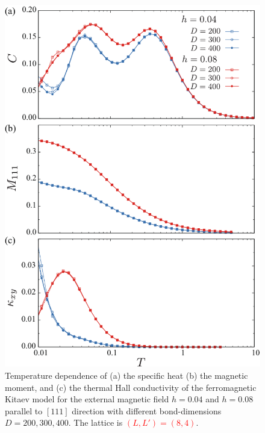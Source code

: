 \documentclass[reprint,amsmath,amssymb,aps,prx]{revtex4-2}
\newcommand{\red}[1]{\textcolor{red}{#1}}
\begin{document}
\begin{figure}
  \begin{center}
    \includegraphics[width=0.9\linewidth]{Figs/plot_CMk_XC4.pdf}
  \end{center}
  \caption{Temperature dependence of (a) the specific heat (b) the magnetic moment, and (c) the thermal Hall conductivity of the ferromagnetic Kitaev model for the external magnetic field $h=0.04$ and $h=0.08$ parallel to $[111]$ direction with different bond-dimensions $D=200, 300, 400$. The lattice is \red{$(L, L') = (8, 4)$}.}
  \label{fig:CMk_XC4}
\end{figure}
\end{document}

